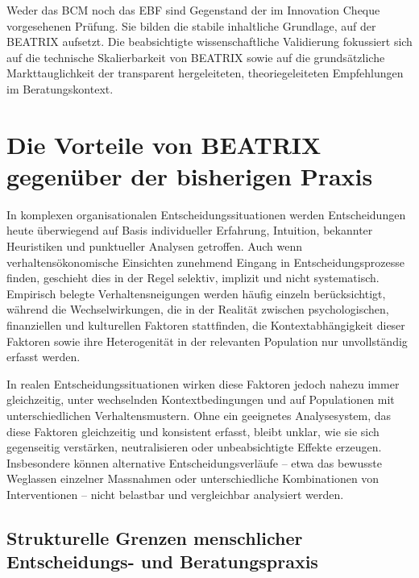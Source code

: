 \documentclass[11pt,a4paper]{article}
\begin{document}
Weder das BCM noch das EBF sind Gegenstand der im Innovation Cheque vorgesehenen Prüfung. Sie bilden die stabile inhaltliche Grundlage, auf der BEATRIX aufsetzt. Die beabsichtigte wissenschaftliche Validierung fokussiert sich auf die technische Skalierbarkeit von BEATRIX sowie auf die grundsätzliche Markttauglichkeit der transparent hergeleiteten, theoriegeleiteten Empfehlungen im Beratungskontext.

\newpage


\section{Die Vorteile von BEATRIX gegenüber der bisherigen Praxis}

In komplexen organisationalen Entscheidungssituationen werden Entscheidungen heute überwiegend auf Basis individueller Erfahrung, Intuition, bekannter Heuristiken und punktueller Analysen getroffen. Auch wenn verhaltensökonomische Einsichten zunehmend Eingang in Entscheidungsprozesse finden, geschieht dies in der Regel selektiv, implizit und nicht systematisch. Empirisch belegte Verhaltensneigungen werden häufig einzeln berücksichtigt, während die Wechselwirkungen, die in der Realität zwischen psychologischen, finanziellen und kulturellen Faktoren stattfinden, die Kontextabhängigkeit dieser Faktoren sowie ihre Heterogenität in der relevanten Population nur unvollständig erfasst werden.

In realen Entscheidungssituationen wirken diese Faktoren jedoch nahezu immer gleichzeitig, unter wechselnden Kontextbedingungen und auf Populationen mit unterschiedlichen Verhaltensmustern. Ohne ein geeignetes Analysesystem, das diese Faktoren gleichzeitig und konsistent erfasst, bleibt unklar, wie sie sich gegenseitig verstärken, neutralisieren oder unbeabsichtigte Effekte erzeugen. Insbesondere können alternative Entscheidungsverläufe -- etwa das bewusste Weglassen einzelner Massnahmen oder unterschiedliche Kombinationen von Interventionen -- nicht belastbar und vergleichbar analysiert werden.

\subsection{Strukturelle Grenzen menschlicher Entscheidungs- und Beratungspraxis}
\end{document}
